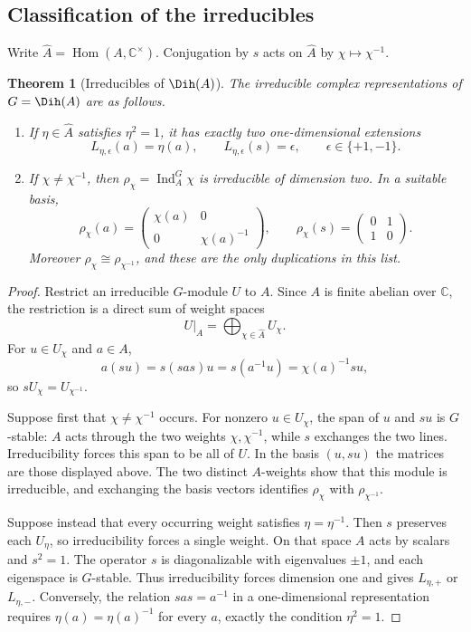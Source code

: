 \documentclass[10pt]{article}
\newcommand{\C}{\mathbb C}
\newtheorem{theorem}{Theorem}
\begin{document}
\subsection{Classification of the irreducibles}

Write $\widehat A=\operatorname{Hom}(A,\C^\times)$.  Conjugation by $s$ acts
on $\widehat A$ by $\chi\mapsto\chi^{-1}$.

\begin{theorem}[Irreducibles of $\Dih(A)$]\label{generalized-dihedral-master-theorem:thm:classification}
The irreducible complex representations of $G=\Dih(A)$ are as follows.
\begin{enumerate}[label=\textup{(\roman*)}]
\item If $\eta\in\widehat A$ satisfies $\eta^2=1$, it has exactly two
one-dimensional extensions
\[
  L_{\eta,\epsilon}(a)=\eta(a),\qquad
  L_{\eta,\epsilon}(s)=\epsilon,\qquad \epsilon\in\{+1,-1\}.
\]
\item If $\chi\ne\chi^{-1}$, then
$\rho_\chi=\operatorname{Ind}_A^G\chi$ is irreducible of dimension two.  In a
suitable basis,
\[
  \rho_\chi(a)=
  \begin{pmatrix}\chi(a)&0\\0&\chi(a)^{-1}\end{pmatrix},
  \qquad
  \rho_\chi(s)=
  \begin{pmatrix}0&1\\1&0\end{pmatrix}.
\]
Moreover $\rho_\chi\cong\rho_{\chi^{-1}}$, and these are the only
duplications in this list.
\end{enumerate}
\end{theorem}

\begin{proof}
Restrict an irreducible $G$-module $U$ to $A$.  Since $A$ is finite abelian
over $\C$, the restriction is a direct sum of weight spaces
\[
  U|_A=\bigoplus_{\chi\in\widehat A}U_\chi.
\]
For $u\in U_\chi$ and $a\in A$,
\[
  a(su)=s(sas)u=s(a^{-1}u)=\chi(a)^{-1}su,
\]
so $sU_\chi=U_{\chi^{-1}}$.

Suppose first that $\chi\ne\chi^{-1}$ occurs.  For nonzero
$u\in U_\chi$, the span of $u$ and $su$ is $G$-stable: $A$ acts through the
two weights $\chi,\chi^{-1}$, while $s$ exchanges the two lines.
Irreducibility forces this span to be all of $U$.  In the basis $(u,su)$ the
matrices are those displayed above.  The two distinct $A$-weights show that
this module is irreducible, and exchanging the basis vectors identifies
$\rho_\chi$ with $\rho_{\chi^{-1}}$.

Suppose instead that every occurring weight satisfies
$\eta=\eta^{-1}$.  Then $s$ preserves each $U_\eta$, so irreducibility forces
a single weight.  On that space $A$ acts by scalars and $s^2=1$.  The operator
$s$ is diagonalizable with eigenvalues $\pm1$, and each eigenspace is
$G$-stable.  Thus irreducibility forces dimension one and gives
$L_{\eta,+}$ or $L_{\eta,-}$.  Conversely, the relation $sas=a^{-1}$ in a
one-dimensional representation requires $\eta(a)=\eta(a)^{-1}$ for every
$a$, exactly the condition $\eta^2=1$.
\end{proof}
\end{document}
